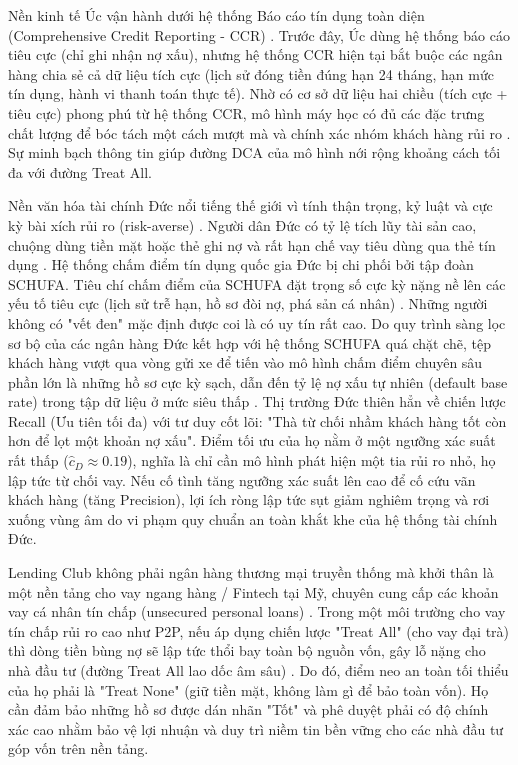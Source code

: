 Nền kinh tế Úc vận hành dưới hệ thống Báo cáo tín dụng toàn diện (Comprehensive Credit Reporting - CCR) \cite{Australia2021MandatoryCCR}. Trước đây, Úc dùng hệ thống báo cáo tiêu cực (chỉ ghi nhận nợ xấu), nhưng hệ thống CCR hiện tại bắt buộc các ngân hàng chia sẻ cả dữ liệu tích cực (lịch sử đóng tiền đúng hạn 24 tháng, hạn mức tín dụng, hành vi thanh toán thực tế). Nhờ có cơ sở dữ liệu hai chiều (tích cực + tiêu cực) phong phú từ hệ thống CCR, mô hình máy học có đủ các đặc trưng chất lượng để bóc tách một cách mượt mà và chính xác nhóm khách hàng rủi ro \cite{Treasury2023CCR}. Sự minh bạch thông tin giúp đường DCA của mô hình nới rộng khoảng cách tối đa với đường Treat All.

Nền văn hóa tài chính Đức nổi tiếng thế giới vì tính thận trọng, kỷ luật và cực kỳ bài xích rủi ro (risk-averse) \cite{BundesbankCash}. Người dân Đức có tỷ lệ tích lũy tài sản cao, chuộng dùng tiền mặt hoặc thẻ ghi nợ và rất hạn chế vay tiêu dùng qua thẻ tín dụng \cite{BundesbankCash}. Hệ thống chấm điểm tín dụng quốc gia Đức bị chi phối bởi tập đoàn SCHUFA. Tiêu chí chấm điểm của SCHUFA đặt trọng số cực kỳ nặng nề lên các yếu tố tiêu cực (lịch sử trễ hạn, hồ sơ đòi nợ, phá sản cá nhân) \cite{ECJ2023SCHUFA}. Những người không có "vết đen" mặc định được coi là có uy tín rất cao. Do quy trình sàng lọc sơ bộ của các ngân hàng Đức kết hợp với hệ thống SCHUFA quá chặt chẽ, tệp khách hàng vượt qua vòng gửi xe để tiến vào mô hình chấm điểm chuyên sâu phần lớn là những hồ sơ cực kỳ sạch, dẫn đến tỷ lệ nợ xấu tự nhiên (default base rate) trong tập dữ liệu ở mức siêu thấp \cite{WorldBankNPLGermany}. Thị trường Đức thiên hẳn về chiến lược Recall (Ưu tiên tối đa) với tư duy cốt lõi: "Thà từ chối nhầm khách hàng tốt còn hơn để lọt một khoản nợ xấu". Điểm tối ưu của họ nằm ở một ngưỡng xác suất rất thấp ($\hat{c}_D \approx 0.19$), nghĩa là chỉ cần mô hình phát hiện một tia rủi ro nhỏ, họ lập tức từ chối vay. Nếu cố tình tăng ngưỡng xác suất lên cao để cố cứu vãn khách hàng (tăng Precision), lợi ích ròng lập tức sụt giảm nghiêm trọng và rơi xuống vùng âm do vi phạm quy chuẩn an toàn khắt khe của hệ thống tài chính Đức.

Lending Club không phải ngân hàng thương mại truyền thống mà khởi thân là một nền tảng cho vay ngang hàng / Fintech tại Mỹ, chuyên cung cấp các khoản vay cá nhân tín chấp (unsecured personal loans) \cite{LendingClub10K}. Trong một môi trường cho vay tín chấp rủi ro cao như P2P, nếu áp dụng chiến lược "Treat All" (cho vay đại trà) thì dòng tiền bùng nợ sẽ lập tức thổi bay toàn bộ nguồn vốn, gây lỗ nặng cho nhà đầu tư (đường Treat All lao dốc âm sâu) \cite{SerranoCinca2016}. Do đó, điểm neo an toàn tối thiểu của họ phải là "Treat None" (giữ tiền mặt, không làm gì để bảo toàn vốn). Họ cần đảm bảo những hồ sơ được dán nhãn "Tốt" và phê duyệt phải có độ chính xác cao nhằm bảo vệ lợi nhuận và duy trì niềm tin bền vững cho các nhà đầu tư góp vốn trên nền tảng.


